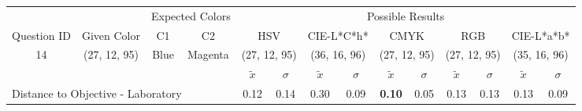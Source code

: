 \begin{table}[H]
  \resizebox{\textwidth}{!} {
  \begin{tabular}{lccccccccccccc}
    \hline
    \multicolumn{1}{c}{}                              &                                      & \multicolumn{2}{c}{Expected Colors}                   & \multicolumn{10}{c}{Possible Results}                                                                                                                                                                                                                                                                                        \\ \cline{3-14}
    \multicolumn{1}{c}{\multirow{-2}{*}{Question ID}} & \multirow{-2}{*}{Given Color}        & C1                       & C2                         & \multicolumn{2}{c}{HSV}                                        & \multicolumn{2}{c}{CIE-L*C*h*}                                 & \multicolumn{2}{c}{CMYK}                                       & \multicolumn{2}{c}{RGB}                                        & \multicolumn{2}{c}{CIE-L*a*b*}                                 \\ \hline
    \multicolumn{1}{c}{14}                             & \cellcolor[HTML]{8000FF}(27, 12, 95) & \multicolumn{1}{c|}{Blue} & \multicolumn{1}{c|}{Magenta}  & \multicolumn{2}{c|}{\cellcolor[HTML]{8000FF}(27, 12, 95)}      & \multicolumn{2}{c|}{\cellcolor[HTML]{B000FF}(36, 16, 96)}       & \multicolumn{2}{c|}{\cellcolor[HTML]{8000FF}(27, 12, 95)}       & \multicolumn{2}{c|}{\cellcolor[HTML]{8000FF}(27, 12, 95)}       & \multicolumn{2}{c|}{\cellcolor[HTML]{AB00FF}(35, 16, 96)}       \\ \hline
                                                      & \multicolumn{1}{l}{}                 & \multicolumn{1}{l}{}     & \multicolumn{1}{l}{}       & \multicolumn{1}{c}{$\tilde{x}$} & \multicolumn{1}{c}{$\sigma$} & \multicolumn{1}{c}{$\tilde{x}$} & \multicolumn{1}{c}{$\sigma$} & \multicolumn{1}{c}{$\tilde{x}$} & \multicolumn{1}{c}{$\sigma$} & \multicolumn{1}{c}{$\tilde{x}$} & \multicolumn{1}{c}{$\sigma$} & \multicolumn{1}{c}{$\tilde{x}$} & \multicolumn{1}{c}{$\sigma$} \\ \hline
    \multicolumn{4}{l}{Distance to Objective - Laboratory}                                                                                           & \multicolumn{1}{|c}{0.12}       & \multicolumn{1}{c|}{0.14}    & \multicolumn{1}{|c}{0.30}       & \multicolumn{1}{c|}{0.09}    & \multicolumn{1}{|c}{\textbf{0.10}}       & \multicolumn{1}{c|}{0.05}    & \multicolumn{1}{|c}{0.13}       & \multicolumn{1}{c|}{0.13}    & \multicolumn{1}{|c}{0.13}       & \multicolumn{1}{c|}{0.09}    \\

\end{tabular}}
\end{table}

